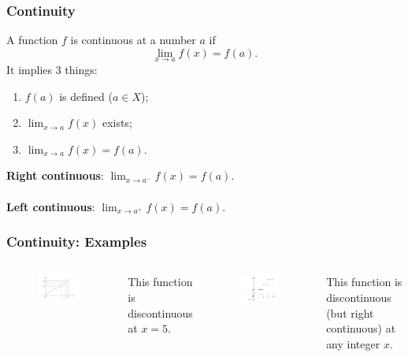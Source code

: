 \documentclass{beamer}
\begin{document}
\begin{frame}
\frametitle{Continuity}
A function $f$ is continuous at a number $a$ if
$$
\lim_{x \rightarrow a} f(x) = f(a).
$$
It implies 3 things:
\begin{enumerate}
\item $f(a)$ is defined ($a \in X$);
\item $\lim_{x \rightarrow a} f(x)$ exists;
\item $\lim_{x \rightarrow a} f(x) = f(a)$.
\end{enumerate}
\vspace*{0.15in}
\textbf{Right continuous}: $\lim_{x \rightarrow a^{-}} f(x) = f(a)$.
\\~\\
\textbf{Left continuous}: $\lim_{x \rightarrow a^{+}} f(x) = f(a)$.

\end{frame}

\begin{frame}
\frametitle{Continuity: Examples}
\begin{columns}[t] %

\vspace*{-0.15in}
\begin{figure}[H]
\centering
\includegraphics[width=6.2cm]{Function-limit-eg.png}
\end{figure}
This function is discontinuous at $x=5$.

\vspace*{-0.15in}
\begin{figure}[H]
\centering
\includegraphics[width=5.5cm]{Function-cont-eg.png}
\end{figure}
\vspace*{-0.1in}
This function is discontinuous (but right continuous) at any integer $x$.

\end{columns}
 \end{frame}
\end{document}

